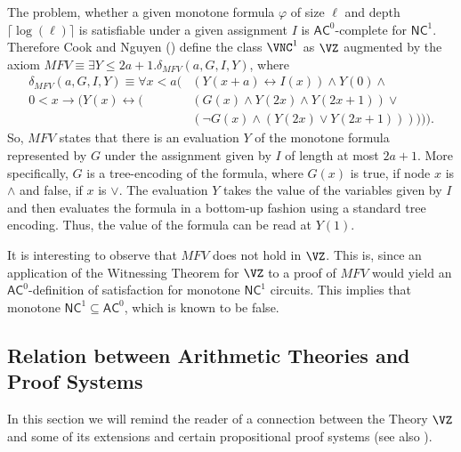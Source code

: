 \documentclass{LMCS}
\begin{document}
The problem, whether a given monotone formula $\varphi$ of size $\ell$ and depth $\lceil\log(\ell)\rceil$ is
satisfiable under a given assignment $I$ is $\mathsf{AC}^0$-complete for $\mathsf{NC}^1$. Therefore Cook and
Nguyen (\cite{CN10}) define the class $\VNC^1$ as $\VZ$ augmented by the axiom $MFV\equiv \exists Y\leq
2a+1.\delta_{MFV}(a,G,I,Y)$, where
\begin{equation*}
 \begin{split}
    \delta_{MFV}(a,G,I,Y)\equiv \forall x<a(&(Y(x+a)\leftrightarrow I(x))\land Y(0)\land\\
    0<x\rightarrow(Y(x)\leftrightarrow(&(G(x)\land Y(2x)\land
    Y(2x+1))\vee\\& (\neg G(x)\land (Y(2x)\vee Y(2x+1)))))).
  \end{split}
\end{equation*}
So, $MFV$ states that there is an evaluation $Y$ of the monotone formula represented by $G$ under the assignment
given by $I$ of length at most $2a+1$. More specifically, $G$ is a tree-encoding of the formula, where $G(x)$ is
true, if node $x$ is $\land$ and false, if $x$ is $\vee$. The evaluation $Y$ takes the value of the variables
given by $I$ and then evaluates the formula in a bottom-up fashion using a standard tree encoding. Thus, the
value of the formula can be read at $Y(1)$.

It is interesting to observe that $MFV$ does not hold in $\VZ$. This is, since an application of the Witnessing
Theorem for $\VZ$ to a proof of $MFV$ would yield an $\mathsf{AC}^0$-definition of satisfaction for monotone
$\mathsf{NC}^1$ circuits. This implies that monotone $\mathsf{NC}^1\subseteq\mathsf{AC}^0$, which is known to be
false.


\subsection{Relation between Arithmetic Theories and Proof Systems}\label{Sec:Rel BA pps}

In this section we will remind the reader of a connection between the Theory $\VZ$ and some of its extensions
and certain propositional proof systems (see also \cite{CN10}\cite{Kra95}).
\end{document}
